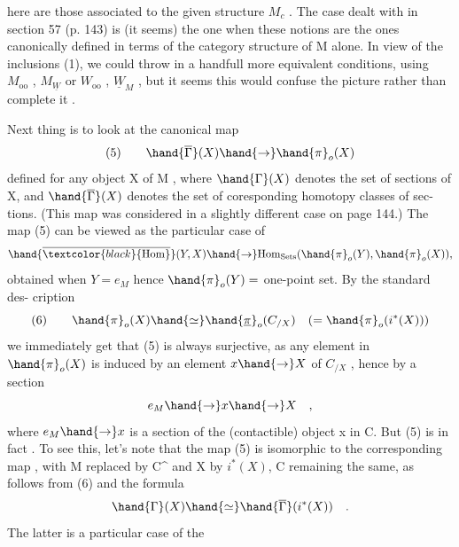 
here are those associated to the given structure $M_c$ . The case dealt with
in section 57 (p. 143) is  (it seems)  the one when
these notions are the ones canonically defined in terms of the category
structure of M alone. In view of the inclusions (1), we could throw in
a handfull more  equivalent conditions, using $M_{\mathrm{oo}}$ , $M_{\underline{W}}$ or $W_{\mathrm{oo}}$ , $\underline{W}_M$ , but
it seems this would confuse the picture rather than complete it .

Next thing is to look at the canonical map
\[ (5) \qquad \hand{\overline{\Gamma}}(X) \hand{\to} \hand{\pi}_o(X) \]
defined for any object X of M , where $\hand{\Gamma}(X)$ denotes the set of sections
of X, and $\hand{\overline{\Gamma}}(X)$ denotes the set of coresponding homotopy classes of sec-%
tions. (This map was considered in a  slightly different case
on page 144.) The map (5) can be viewed as the particular case of
\[ \hand{\overline{\textcolor{black}{\mathrm{Hom}}}}(Y,X) \hand{\to} \mathrm{Hom}_{\mathrm{Sets}}(\hand{\pi}_o(Y),\hand{\pi}_o(X)) , \]
obtained when $Y = e_M$ hence $\hand{\pi}_o(Y) =$ one-point set. By the standard des-%
cription
\[ (6) \qquad \hand{\pi}_o(X)\hand{\simeq} \hand{\underline{\pi}}_o(C_{/X}) \quad ( = \hand{\pi}_o(i^*(X))) \]
we immediately get that (5) is always surjective, as any element in $\hand{\pi}_o(X)$
is induced by an element $x \hand{\to} X$ of $C_{/X}$ , hence by a section
\[ e_M \hand{\to} x \hand{\to} X \quad , \]
where $e_M \hand{\to} x$ is a section of the (contactible) object x in C. But (5)
is in fact \hand{\uline{\textcolor{black}{bijective}}} . To see this, let's note that the map (5) is
isomorphic to the corresponding map , with M replaced by C\^{} and X by $i^*(X)$,
C remaining the same, as follows from  (6) and the formula
\[ \hand{\Gamma}(X)\hand{\simeq} \hand{\overline{\Gamma}}(i^*(X)) \quad . \]
The latter is a particular case of the

